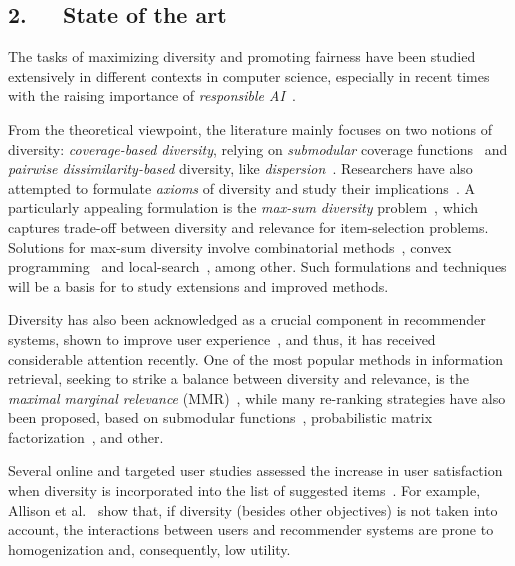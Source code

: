 \documentclass[a4paper,11pt]{article}
\begin{document}



\subsection*{2.~~~State of the art}

The tasks of maximizing diversity and promoting fairness have been studied 
extensively in different contexts in computer science, 
especially in recent times with the raising importance of \emph{responsible AI}~\cite{dignum2019responsible}.


From the theoretical viewpoint, the literature mainly focuses on two notions of diversity: 
\emph{coverage-based diversity}, relying on \emph{submodular} coverage functions~\cite{bach2013learning} 
and \emph{pairwise dissimilarity-based} diversity, like \emph{dispersion}~\cite{hassin1997approximation}.
Researchers have also attempted to formulate \emph{axioms} of diversity and study
their implications~\cite{gollapudi2009axiomatic}. 
A particularly appealing formulation is the \emph{max-sum diversity} problem~\cite{borodin2012max},
which captures trade-off between diversity and relevance for item-selection problems.
Solutions for max-sum diversity involve combinatorial methods~\cite{borodin2012max},
convex programming~\cite{cevallos2016max} and 
local-search~\cite{cevallos2019improved}, among other.
Such formulations and techniques will be a basis for {\acronym}
to study extensions and improved methods. 



Diversity has also been acknowledged as a crucial component in recommender systems,
shown to improve user experience~\cite{Castells2022}, 
and thus, it has received considerable attention recently. 
One of the most popular methods in information retrieval,
seeking to strike a balance between diversity and relevance, 
is the \emph{maximal marginal relevance} (MMR)~\cite{MMR}, 
while many re-ranking strategies have also been proposed, 
based on submodular functions~\cite{DUM}, 
probabilistic matrix factorization~\cite{DPMF}, 
and other.

Several online and targeted user studies assessed the increase in user satisfaction when diversity is incorporated into the list of suggested items~\cite{diversity_top_n_recs, Castells2022}. For example, Allison et al.~\cite{algorithmic_confounding} show that, if diversity (besides other objectives) is not taken into account, the interactions between users and recommender systems are prone to homogenization and, consequently, low utility.
\end{document}
